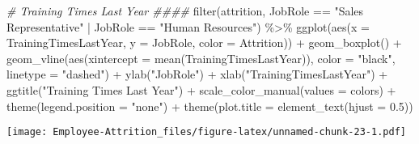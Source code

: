 \documentclass[
]{article}
\newenvironment{Shaded}{\begin{snugshade}}{\end{snugshade}}
\newcommand{\AttributeTok}[1]{\textcolor[rgb]{0.77,0.63,0.00}{#1}}
\newcommand{\CommentTok}[1]{\textcolor[rgb]{0.56,0.35,0.01}{\textit{#1}}}
\newcommand{\FloatTok}[1]{\textcolor[rgb]{0.00,0.00,0.81}{#1}}
\newcommand{\FunctionTok}[1]{\textcolor[rgb]{0.00,0.00,0.00}{#1}}
\newcommand{\NormalTok}[1]{#1}
\newcommand{\SpecialCharTok}[1]{\textcolor[rgb]{0.00,0.00,0.00}{#1}}
\newcommand{\StringTok}[1]{\textcolor[rgb]{0.31,0.60,0.02}{#1}}
\begin{document}
\begin{Shaded}
\begin{Highlighting}[]
\CommentTok{\# Training Times Last Year \#\#\#\#}
\FunctionTok{filter}\NormalTok{(attrition, JobRole }\SpecialCharTok{==} \StringTok{"Sales Representative"} \SpecialCharTok{|}\NormalTok{ JobRole }\SpecialCharTok{==} \StringTok{"Human Resources"}\NormalTok{) }\SpecialCharTok{\%\textgreater{}\%}
  \FunctionTok{ggplot}\NormalTok{(}\FunctionTok{aes}\NormalTok{(}\AttributeTok{x =}\NormalTok{ TrainingTimesLastYear, }\AttributeTok{y =}\NormalTok{ JobRole, }\AttributeTok{color =}\NormalTok{ Attrition)) }\SpecialCharTok{+}
  \FunctionTok{geom\_boxplot}\NormalTok{() }\SpecialCharTok{+}
  \FunctionTok{geom\_vline}\NormalTok{(}\FunctionTok{aes}\NormalTok{(}\AttributeTok{xintercept =} \FunctionTok{mean}\NormalTok{(TrainingTimesLastYear)), }\AttributeTok{color =} \StringTok{"black"}\NormalTok{, }\AttributeTok{linetype =} \StringTok{"dashed"}\NormalTok{) }\SpecialCharTok{+}
  \FunctionTok{ylab}\NormalTok{(}\StringTok{"JobRole"}\NormalTok{) }\SpecialCharTok{+}
  \FunctionTok{xlab}\NormalTok{(}\StringTok{"TrainingTimesLastYear"}\NormalTok{) }\SpecialCharTok{+}
  \FunctionTok{ggtitle}\NormalTok{(}\StringTok{"Training Times Last Year"}\NormalTok{) }\SpecialCharTok{+}
  \FunctionTok{scale\_color\_manual}\NormalTok{(}\AttributeTok{values =}\NormalTok{ colors) }\SpecialCharTok{+}
  \FunctionTok{theme}\NormalTok{(}\AttributeTok{legend.position =} \StringTok{"none"}\NormalTok{) }\SpecialCharTok{+}
  \FunctionTok{theme}\NormalTok{(}\AttributeTok{plot.title =} \FunctionTok{element\_text}\NormalTok{(}\AttributeTok{hjust =} \FloatTok{0.5}\NormalTok{)) }
\end{Highlighting}
\end{Shaded}

\texttt{[image: Employee-Attrition\_files/figure-latex/unnamed-chunk-23-1.pdf]}
\end{document}
